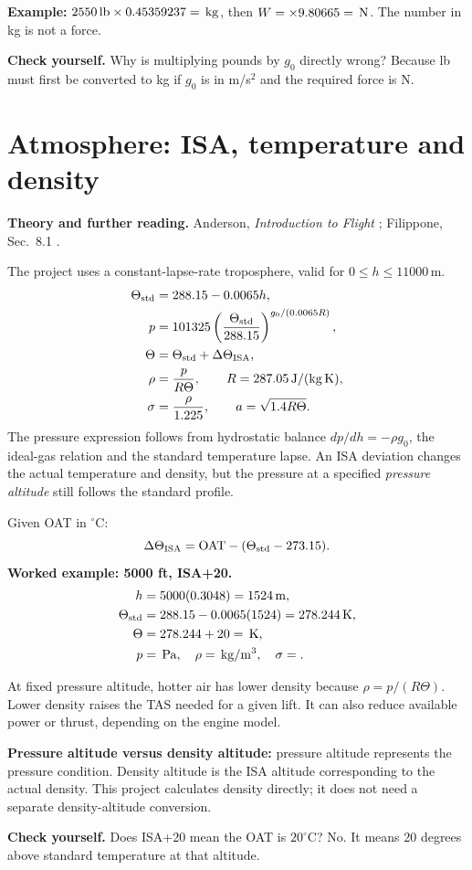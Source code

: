 \documentclass[11pt,letterpaper]{article}
\newcommand{\val}[1]{\csname value#1\endcsname}
\newcommand{\unit}[1]{\,\mathrm{#1}}
\newcommand{\topic}[1]{\clearpage\section{#1}}
\newcommand{\reading}[1]{{\small\color{navy}\textbf{Theory and further reading.} #1\par}\vspace{3pt}}
\newcommand{\selfcheck}[1]{\par\textbf{Check yourself.} #1\par}
\begin{document}
\textbf{Example:} $2550\unit{lb}\times0.45359237=\val{mass}\unit{kg}$, then
$W=\val{mass}\times9.80665=\val{weight}\unit{N}$.
The number in kg is not a force.
\selfcheck{Why is multiplying pounds by $g_0$ directly wrong? Because lb must first
be converted to kg if $g_0$ is in m/s$^2$ and the required force is N.}

\topic{Atmosphere: ISA, temperature and density}
\reading{Anderson, \emph{Introduction to Flight} \cite{anderson-flight}; Filippone, Sec.~8.1 \cite{filippone}.}
The project uses a constant-lapse-rate troposphere, valid for
$0\le h\le11000\unit m$.
\begin{align*}
\Theta_{\rm std}&=288.15-0.0065h,\\
p&=101325\left(\frac{\Theta_{\rm std}}{288.15}\right)^{g_0/(0.0065R)},\\
\Theta&=\Theta_{\rm std}+\Delta\Theta_{\rm ISA},\\
\rho&=\frac{p}{R\Theta},\qquad R=287.05\unit{J/(kg\,K)},\\
\sigma&=\frac{\rho}{1.225},\qquad a=\sqrt{1.4R\Theta}.
\end{align*}
The pressure expression follows from hydrostatic balance
$dp/dh=-\rho g_0$, the ideal-gas relation and the standard temperature lapse.
An ISA deviation changes the actual temperature and density, but the pressure
at a specified \emph{pressure altitude} still follows the standard profile.

Given OAT in $^\circ$C:
\[
\Delta\Theta_{\rm ISA}=\mathrm{OAT}-(\Theta_{\rm std}-273.15).
\]
\textbf{Worked example: 5000 ft, ISA+20.}
\begin{align*}
h&=5000(0.3048)=1524\unit m,\\
\Theta_{\rm std}&=288.15-0.0065(1524)=278.244\unit K,\\
\Theta&=278.244+20=\val{tempFive}\unit K,\\
p&=\val{pressFive}\unit{Pa},\quad
\rho=\val{rhoFive}\unit{kg/m^3},\quad\sigma=\val{sigmaFive}.
\end{align*}
\begin{keyidea}
At fixed pressure altitude, hotter air has lower density because
$\rho=p/(R\Theta)$. Lower density raises the TAS needed for a given lift.
It can also reduce available power or thrust, depending on the engine model.
\end{keyidea}
\textbf{Pressure altitude versus density altitude:} pressure altitude represents
the pressure condition. Density altitude is the ISA altitude corresponding to
the actual density. This project calculates density directly; it does not need
a separate density-altitude conversion.
\selfcheck{Does ISA+20 mean the OAT is $20^\circ$C? No. It means 20 degrees above
standard temperature at that altitude.}
\end{document}
